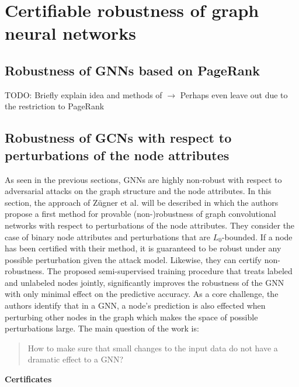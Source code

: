 \documentclass[a4paper,preprint]{sig-alternate}
\begin{document}
\section{Certifiable robustness of graph neural networks}
\label{sec:main_section}

\subsection{Robustness of GNNs based on PageRank}
\label{sec:paper_one}

TODO: Briefly explain idea and methods of \cite{bojchevski2019certifiable}\newline
$\rightarrow$ Perhaps even leave out due to the restriction to PageRank

\vfill
\pagebreak

\subsection{Robustness of GCNs with respect to perturbations of the node attributes}
\label{sec:paper_two}

As seen in the previous sections, GNNs are highly non-robust with respect to adversarial attacks on the graph
structure and the node attributes. In this section, the approach of Zügner et al. \cite{Z_gner_2019} will be described
in which the authors propose a first method for provable (non-)robustness of graph convolutional networks with respect
to perturbations of the node attributes.\newline
They consider the case of binary node attributes and perturbations that are $L_0$-bounded. If a node has been certified
with their method, it is guaranteed to be robust under any possible perturbation given the attack model. Likewise, they can
certify non-robustness. The proposed semi-supervised training procedure that treats labeled and unlabeled nodes jointly,
significantly improves the robustness of the GNN with only minimal effect on the predictive accuracy.
As a core challenge, the authors identify that in a GNN, a node's prediction is also effected when perturbing other nodes in the graph
which makes the space of possible perturbations large. The main question of the work is:
\begin{quote}
How to make sure that small changes to the input data do not have a dramatic effect to a GNN?
\end{quote}

\textbf{Certificates}\newline
\end{document}
